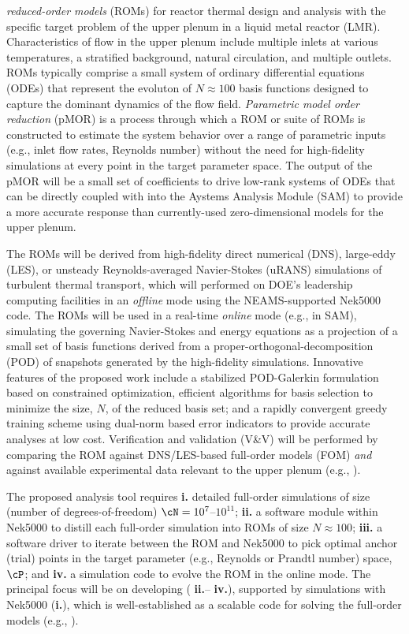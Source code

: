 {{\em reduced-order
models} (ROMs) for reactor thermal design and analysis with the specific target
problem of the upper plenum in a liquid metal reactor (LMR).  Characteristics
of flow in the upper plenum include multiple inlets at various temperatures, a
stratified background, natural circulation, and multiple outlets.  
   ROMs typically comprise a small system of ordinary differential equations
(ODEs) that represent the evoluton of $N \approx 100$ basis functions designed
to capture the dominant dynamics of the flow field.
   {\em Parametric model order reduction} (pMOR) is a process through which
a ROM or suite of ROMs is constructed to estimate the system behavior 
over a range of parametric inputs (e.g., inlet flow rates, Reynolds number)
without the need for high-fidelity simulations at every point in the target
parameter space.  The output of the pMOR will be a small set 
of coefficients to drive low-rank systems of ODEs that can be directly coupled
with into the Aystems Analysis Module (SAM) to provide a more accurate response
than currently-used zero-dimensional models for the upper plenum.

The ROMs will be derived from high-fidelity direct numerical
(DNS), large-eddy (LES), or unsteady Reynolds-averaged Navier-Stokes (uRANS)
simulations of turbulent thermal transport, which will performed on DOE's
leadership computing facilities in an {\em offline} mode using the
NEAMS-supported Nek5000 code.  The ROMs will be used in a real-time {\em
online} mode (e.g., in SAM), simulating the governing Navier-Stokes and energy
equations as a projection of a small set of basis functions derived from a
proper-orthogonal-decomposition (POD) of snapshots generated by the
high-fidelity simulations.  Innovative features of the proposed work include a
stabilized POD-Galerkin formulation based on constrained optimization,
efficient algorithms for basis selection to minimize the size, $N$, of the
reduced basis set;  and a rapidly convergent greedy training scheme using
dual-norm based error indicators to provide accurate analyses at low cost.  
Verification and validation (V\&V) will be performed by comparing the ROM
against DNS/LES-based full-order models (FOM) {\em and} against available
experimental data relevant to the upper plenum (e.g., \cite{lomperski17}).


The proposed analysis tool requires 
 \textbf{i.} detailed full-order simulations of size (number of degrees-of-freedom)
$\cN=10^7$--$10^{11}$;
 \textbf{ii.} a software module within Nek5000 to distill each full-order
simulation into ROMs of size $N \approx 100$;
 \textbf{iii.} a software driver to iterate between the ROM and Nek5000 to 
pick optimal anchor (trial) points in the target parameter 
(e.g., Reynolds or Prandtl number) space, $\cP$;
and
 \textbf{iv.} a simulation code to evolve the ROM in the online mode. 
The principal focus will be on developing ( \textbf{ii.}-- \textbf{iv.}), supported by
simulations with Nek5000 (\textbf{i.}), which is well-established as a scalable
code for solving the full-order models (e.g., \cite{merzari11b,merzari15a}). 

}
